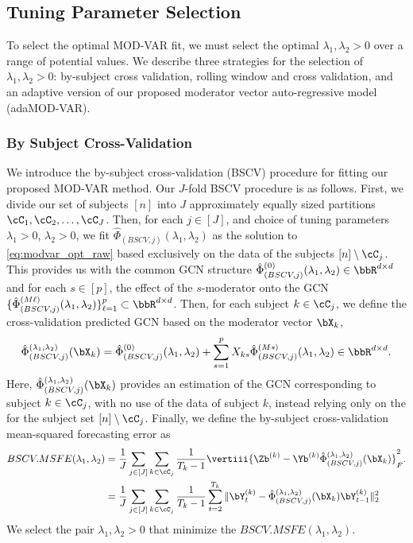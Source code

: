 

\subsection{Tuning Parameter Selection}

To select the optimal MOD-VAR fit, we must select the optimal $\lambda_1,\lambda_2>0$ over a range of potential values. We describe three strategies for the selection of $\lambda_1,\lambda_2>0$: by-subject cross validation, rolling window and cross validation, and an adaptive version of our proposed moderator vector auto-regressive model (adaMOD-VAR). 


\subsubsection{By Subject Cross-Validation}

We introduce the by-subject cross-validation (BSCV) procedure for fitting our proposed MOD-VAR method. Our $J$-fold BSCV procedure is as follows. First, we divide our set of subjects $[n]$ into $J$ approximately equally sized partitions $\cC_1,\cC_2,\ldots ,\cC_J$. Then, for each $j\in[J]$, and choice of tuning parameters $\lambda_1 > 0$, $\lambda_2 > 0$, we fit $\hat\Phi_{(BSCV,j)}(\lambda_1,\lambda_2)$ as the solution to \eqref{eq:modvar_opt_raw} based exclusively on the data of the subjects $[n]\setminus\cC_j$. This provides us with the common GCN structure $\hat\Phi_{(BSCV,j)}^{(0)}(\lambda_1,\lambda_2)\in\bbR^{d\times d}$ and for each $s\in[p]$, the effect of the $s$-moderator onto the GCN $\{\hat\Phi_{(BSCV,j)}^{(M\ell)}(\lambda_1,\lambda_2)\}_{\ell=1}^p\subset\bbR^{d\times d}$. Then, for each subject $k\in\cC_j$, we define the cross-validation predicted GCN based on the moderator vector $\bX_k$,
\begin{equation*}
	\hat\Phi_{(BSCV,j)}^{(\lambda_1,\lambda_2)}(\bX_k) = \hat\Phi_{(BSCV,j)}^{(0)}(\lambda_1,\lambda_2) + \sum_{s = 1}^p X_{ks} \hat\Phi_{(BSCV,j)}^{(Ms)}(\lambda_1,\lambda_2)\in\bbR^{d\times d}.
\end{equation*}
Here, $\hat\Phi_{(BSCV,j)}^{(\lambda_1,\lambda_2)}(\bX_k)$ provides an estimation of the GCN corresponding to subject $k\in\cC_j$, with no use of the data of subject $k$, instead relying only on the for the subject set $[n]\setminus\cC_j$. Finally, we define the by-subject cross-validation mean-squared forecasting error as
\begin{align*}
	BSCV.MSFE(\lambda_1,\lambda_2) &= \frac{1}{J}\sum_{j\in[J]} \sum_{k\in\cC_j} \frac{1}{T_k-1}\vertiii{ \Zb^{(k)}- \Yb^{(k)} \hat\Phi_{(BSCV,j)}^{(\lambda_1,\lambda_2)}(\bX_k) }_F^2.\\
	&= \frac{1}{J}\sum_{j\in[J]} \sum_{k\in\cC_j} \frac{1}{T_k-1} \sum_{t=2}^{T_{k}} \| \bY^{(k)}_t - \hat\Phi_{(BSCV,j)}^{(\lambda_1,\lambda_2)}(\bX_k)\bY^{(k)}_{t-1}  \|_2^2
\end{align*}
We select the pair $\lambda_1,\lambda_2> 0$ that minimize the $BSCV.MSFE(\lambda_1,\lambda_2)$.

